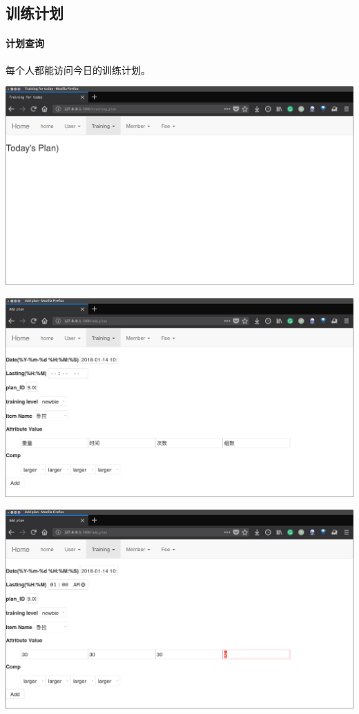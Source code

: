 \subsection{训练计划}
\paragraph{计划查询}
每个人都能访问今日的训练计划。


  \includegraphics[width=\textwidth]{figure/training-plan-before}

  \includegraphics[width=\textwidth]{figure/add-training-plan}
  
  \includegraphics[width=\textwidth]{figure/add-plan-detail}

